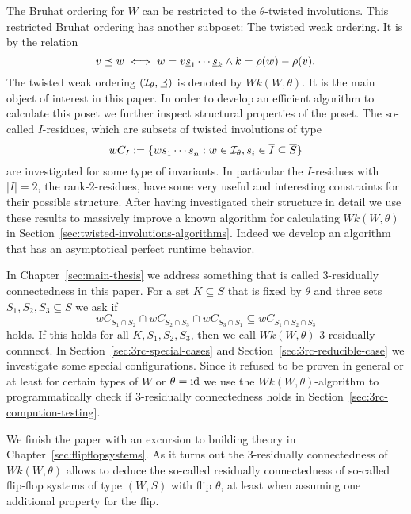 The Bruhat ordering for $W$ can be restricted to the $\theta$-twisted involutions. This restricted Bruhat ordering has another subposet: The twisted weak ordering. It is by the relation
$$ v \preceq w \iff w = v \underline{s}_1 \cdots \underline{s}_k \wedge k = \rho(w) - \rho(v). $$
The twisted weak ordering $(\mathcal{I}_{\theta}, \preceq)$ is denoted by $Wk(W,\theta)$. It is the main object of interest in this paper. In order to develop an efficient algorithm to calculate this poset we further inspect structural properties of the poset. The so-called $I$-residues, which are subsets of twisted involutions of type
$$w C_I := \{ w \underline{s}_1 \cdots \underline{s}_n : w \in \mathcal{I}_{\theta}, \underline{s}_i \in \overline I \subseteq \overline S \} $$
are investigated for some type of invariants. In particular the $I$-residues with $|I|=2$, the rank-2-residues, have some very useful and interesting constraints for their possible structure. After having investigated their structure in detail we use these results to massively improve a known algorithm for calculating $Wk(W,\theta)$ in Section~\ref{sec:twisted-involutions-algorithms}. Indeed we develop an algorithm that has an asymptotical perfect runtime behavior.

In Chapter~\ref{sec:main-thesis} we address something that is called 3-residually connectedness in this paper. For a set $K \subseteq S$ that is fixed by $\theta$ and three sets $S_1,S_2,S_3 \subseteq S$ we ask if
$$ w C_{S_1 \cap S_2} \cap w C_{S_2 \cap S_3} \cap w C_{S_3 \cap S_1} \subseteq w C_{S_1 \cap S_2 \cap S_3} $$
holds. If this holds for all $K,S_1,S_2,S_3$, then we call $Wk(W,\theta)$ 3-residually connnect. In Section~\ref{sec:3rc-special-cases} and Section~\ref{sec:3rc-reducible-case} we investigate some special configurations. Since it refused to be proven in general or at least for certain types of $W$ or $\theta = \operatorname{id}$ we use the $Wk(W,\theta)$-algorithm to programmatically check if 3-residually connectedness holds in Section~\ref{sec:3rc-compution-testing}.

We finish the paper with an excursion to building theory in Chapter~\ref{sec:flipflopsystems}. As it turns out the 3-residually connectedness of $Wk(W,\theta)$ allows to deduce the so-called residually connectedness of so-called flip-flop systems of type $(W,S)$ with flip $\theta$, at least when assuming one additional property for the flip.